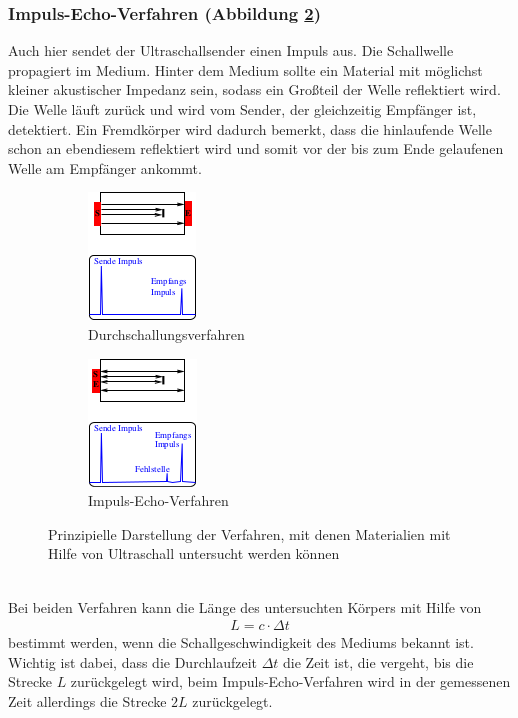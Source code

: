 \subsubsection*{Impuls-Echo-Verfahren (Abbildung \ref{fig:ImpulsEcho})}
Auch hier sendet der Ultraschallsender einen Impuls aus. Die Schallwelle propagiert im Medium. Hinter dem Medium sollte ein Material mit möglichst kleiner akustischer Impedanz sein, sodass ein Großteil der Welle reflektiert wird. Die Welle läuft zurück und wird vom Sender, der gleichzeitig Empfänger ist, detektiert. Ein Fremdkörper wird dadurch bemerkt, dass die hinlaufende Welle schon an ebendiesem reflektiert wird und somit vor der bis zum Ende gelaufenen Welle am Empfänger ankommt.
\begin{figure}[h!]
	\centering
	\begin{subfigure}{.5\textwidth}
		\centering
		\includegraphics[width=.4\textwidth]{Durchschallung.png}
		\caption{Durchschallungsverfahren}
		\label{fig:Durchschall}
	\end{subfigure}%
	\begin{subfigure}{.5\textwidth}
		\centering
		\includegraphics[width=.4\textwidth]{ImpulsEcho.png}
		\caption{Impuls-Echo-Verfahren}
		\label{fig:ImpulsEcho}
	\end{subfigure}
	\caption{Prinzipielle Darstellung der Verfahren, mit denen Materialien mit Hilfe von Ultraschall untersucht werden können}
	\label{fig:test}
\end{figure} \\
Bei beiden Verfahren kann die Länge des untersuchten Körpers mit Hilfe von
\begin{align}
	L = c \cdot \Delta t
\end{align}
bestimmt werden, wenn die Schallgeschwindigkeit des Mediums bekannt ist. Wichtig ist dabei, dass die Durchlaufzeit $\Delta t$ die Zeit ist, die vergeht, bis die Strecke $L$ zurückgelegt wird, beim Impuls-Echo-Verfahren wird in der gemessenen Zeit allerdings die Strecke $2L$ zurückgelegt.

